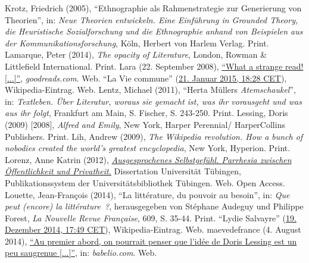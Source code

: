 \documentclass[fontsize=12pt]{scrartcl}
\begin{document}
{{{{\begin{thebibliography}
	Krotz, Friedrich (2005), "`Ethnographie als Rahmenstrategie zur Generierung von Theorien"', in: \textit{Neue Theorien entwickeln. Eine Einf\"uh\-rung in Grounded Theory, die Heuristische Sozialfor\-schung und die Ethnographie anhand von Beispielen aus der Kommunika\-tions\-for\-schung}, K\"oln, Herbert von Harlem Verlag. Print.
	Lamarque, Peter (2014), \textit{The opacity of Li\-te\-ra\-ture}, London, Rowman \& Littlefield International. Print.
	Lara (22. September 2008), \href{https://www.goodreads.com/review/show/31104294}{"`What a strange read! [...]"'}, \textit{goodreads.com}. Web.
	"`La Vie commune"' (\href{https://de.wikipedia.org/w/index.php?title=La_Vie_commune\&oldid=138022681}{21. Januar 2015, 18:28 CET}), Wi\-ki\-pe\-dia-Ein\-trag. Web.
	Lentz, Michael (2011), "`Herta M\"ullers \textit{Atemschaukel}"', in: \textit{Textleben. \"Uber Li\-te\-ra\-tur, wo\-raus sie gemacht ist, was ihr vorausgeht und was aus ihr folgt}, Frankfurt am Main, S. Fischer, S. 243-250. Print.
	Lessing, Doris (2009) [2008], \textit{Alfred and Emily}, New York, Harper Perennial/ HarperCollins Publishers. Print.
	Lih, Andrew (2009), \textit{The Wi\-ki\-pe\-dia revolution. How a bunch of nobodies created the world's greatest encyclopedia}, New York, Hyperion. Print.
	Lorenz, Anne Katrin (2012), \href{https://publikationen.uni-tuebingen.de/xmlui/handle/10900/47049}{\textit{Ausgesprochenes Selbstgef\"uhl. \textit{Parrhesia} zwischen \"Of\-fent\-lichkeit und Privatheit.}} Dissertation Universit\"at T\"ubingen, Publikationssystem der Universit\"atsbib\-liothek T\"ubingen. Web. Open Access.
	Louette, Jean-Fran\c{c}ois (2014), "`La litt\'{e}rature, du pouvoir au besoin"', in: \textit{Que peut (encore) la litt\'{e}rature ?}, he\-rausgegeben von St\'{e}phane Audeguy und Philippe Forest, \textit{La Nouvelle Revue Fran\c{c}aise}, 609, S. 35-44. Print.
	"`Lydie Salvayre"' (\href{https://de.wikipedia.org/w/index.php?title=Lydie_Salvayre\&oldid=136929747}{19. Dezember 2014, 17:49 CET}), Wi\-ki\-pe\-dia-Eintrag. Web.
	maevedefrance (4. August 2014), \href{http://www.babelio.com/livres/Lessing-Alfred-et-Emily/84706/critiques/621555}{"`Au premier abord, on pourrait penser que l'id\'{e}e de Doris Lessing est un peu saugrenue [...]"'}, in: \textit{babelio.com}. Web.

\end{thebibliography}}}}}
\end{document}
